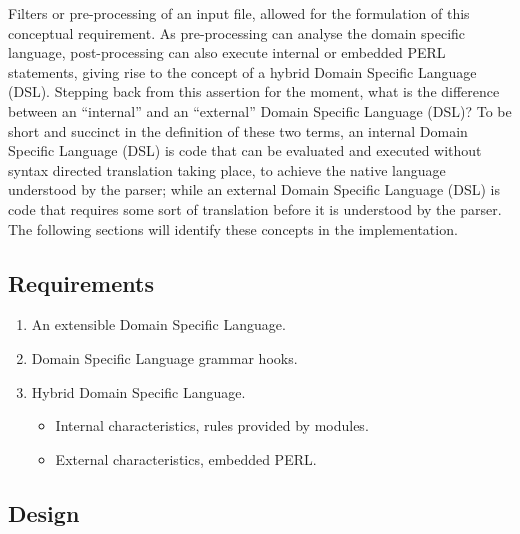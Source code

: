 	Filters or pre-processing of an input file, allowed for the formulation of this conceptual requirement.  As pre-processing can analyse the domain specific
	language, post-processing can also execute internal or embedded PERL statements, giving rise to the concept of a hybrid Domain Specific Language (DSL).
	\newline
	\newline
	Stepping back from this assertion for the moment, what is the difference between an ``internal'' and an ``external'' Domain Specific Language (DSL)?
	To be short and succinct in the definition of these two terms, an internal Domain Specific Language (DSL) is code that can be evaluated and executed
	without syntax directed translation taking place, to achieve the native language understood by the parser; while an external Domain Specific Language (DSL) is code
	that requires some sort of translation before it is understood by the parser.
	\newline
	\newline
	The following sections will identify these concepts in the implementation.
	
\newpage	

	\subsection{Requirements}
	
		\normalsize
		{
			\begin{enumerate}[itemsep=1pt,parsep=1pt]
				\item 	An extensible Domain Specific Language.
				\item 	Domain Specific Language grammar hooks.
				\item 	Hybrid Domain Specific Language.
				\begin{itemize}
					\item Internal characteristics, rules provided by modules.
					\item External characteristics, embedded PERL.
				\end{itemize}
			\end{enumerate} 		
		}
	
	\subsection{Design}
	
